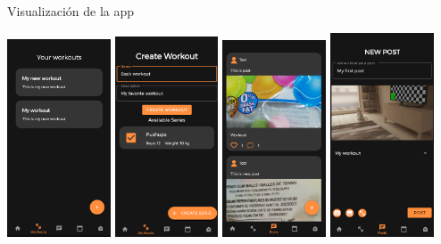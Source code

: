 \documentclass[12pt]{beamer}
\begin{document}
\begin{frame}{Visualización de la app}
{\begin{center}
\includegraphics[width=0.23\textwidth]{yourworkouts}
\includegraphics[width=0.23\textwidth]{createworkout}
\includegraphics[width=0.23\textwidth]{yourposts}
\includegraphics[width=0.23\textwidth]{crearpost}
\end{center}
}


\end{frame}
\end{document}
